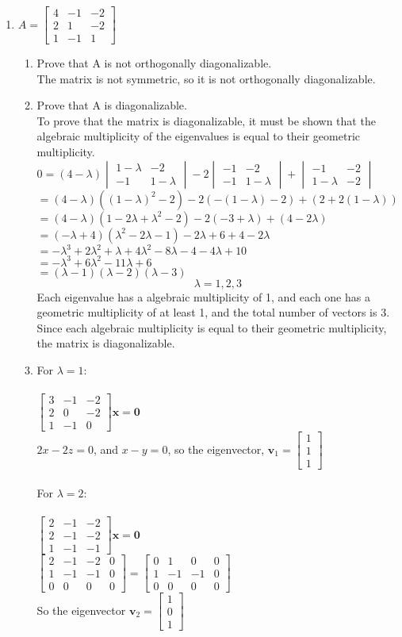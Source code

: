 \documentclass{article}
\newcommand{\newVect}[3]{\begin{bmatrix}#1 \\ #2 \\ #3\end{bmatrix}}
\newcommand{\newttt}[9]{\begin{bmatrix}#1 & #2 & #3\\ #4 & #5 & #6 \\ #7 & #8 & #9\end{bmatrix}}
\newcommand{\newdet}[4]{\begin{vmatrix}#1 & #2\\ #3 & #4 \end{vmatrix}}
\begin{document}
\begin{enumerate}
\item
$A = \newttt{4}{-1}{-2}{2}{1}{-2}{1}{-1}{1}$
\begin{enumerate}
    \item Prove that A is not orthogonally diagonalizable.\\
    The matrix is not symmetric, so it is not orthogonally diagonalizable.
    
    \item Prove that A is diagonalizable.\\
    To prove that the matrix is diagonalizable, it must be shown that the algebraic multiplicity of the eigenvalues is equal to their geometric multiplicity.\\
    $0 = (4-\lambda)\newdet{1-\lambda}{-2}{-1}{1-\lambda} - 2\newdet{-1}{-2}{-1}{1-\lambda} + \newdet{-1}{-2}{1-\lambda}{-2}$\\
    $= (4-\lambda)((1-\lambda)^2-2)-2(-(1-\lambda)-2) + (2+2(1-\lambda))$\\
    $= (4-\lambda)(1-2\lambda+\lambda^2 -2) -2(-3 + \lambda) + (4 - 2\lambda)$\\
    $= (-\lambda+4)(\lambda^2 -2\lambda - 1) - 2\lambda + 6 + 4 - 2\lambda$\\
    $= -\lambda^3 + 2\lambda^2 + \lambda + 4\lambda^2 -8\lambda - 4 -4\lambda + 10$\\
    $= -\lambda^3 + 6\lambda^2 -11\lambda + 6$\\
    $= (\lambda -1)(\lambda-2)(\lambda-3)$\\
    $$\lambda = 1,2,3$$
    Each eigenvalue has a algebraic multiplicity of 1, and each one has a geometric multiplicity of at least 1, and the total number of vectors is 3. Since each algebraic multiplicity is equal to their geometric multiplicity, the matrix is diagonalizable.
    
    \item
    For $\lambda = 1$:\\\\
    $\newttt{3}{-1}{-2}{2}{0}{-2}{1}{-1}{0}\textbf{x} = \textbf{0}$\\
    $2x-2z = 0$, and $x-y = 0$, so the eigenvector, $\textbf{v}_1 = \newVect{1}{1}{1}$\\\\
    
    For $\lambda = 2$:\\\\
    $\newttt{2}{-1}{-2}{2}{-1}{-2}{1}{-1}{-1}\textbf{x} = \textbf{0}$\\
    $\begin{bmatrix}
    2&-1&-2&0\\
    1&-1&-1&0\\
    0&0&0&0
    \end{bmatrix} = 
    \begin{bmatrix}
    0&1&0&0\\
    1&-1&-1&0\\
    0&0&0&0
    \end{bmatrix}$\\
    So the eigenvector $\textbf{v}_2 = \newVect{1}{0}{1}$\\\\
    

\end{enumerate}
\end{enumerate}
\end{document}
